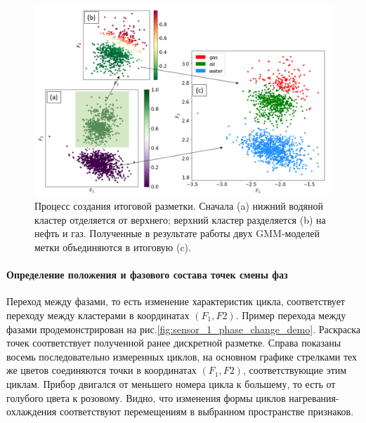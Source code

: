 \begin{figure}[H]
\centering
\includegraphics[width=1.0\textwidth]{TA/sensor_1_clustering_process.png}
\caption{Процесс создания итоговой разметки. Сначала (a) нижний водяной кластер отделяется от верхнего; верхний кластер разделяется (b) на нефть и газ. Полученные в результате работы двух GMM-моделей метки объединяются в итоговую (c).}
\label{fig:sensor_1_clustering_process}
\end{figure}

\paragraph{Определение положения и фазового состава точек смены фаз}
\par
Переход между фазами, то есть изменение характеристик цикла, соответствует переходу между кластерами в координатах $\left(F_1, F2\right)$. Пример перехода между фазами продемонстрирован на рис.\ref{fig:sensor_1_phase_change_demo}.  Раскраска точек соответствует полученной ранее дискретной разметке. Справа показаны восемь последовательно измеренных циклов, на основном графике стрелками тех же цветов соединяются точки в координатах $\left(F_1, F2\right)$, соответствующие этим циклам. Прибор двигался от меньшего номера цикла к большему, то есть от голубого цвета к розовому. Видно, что изменения формы циклов нагревания-охлаждения соответствуют перемещениям в выбранном пространстве признаков.

